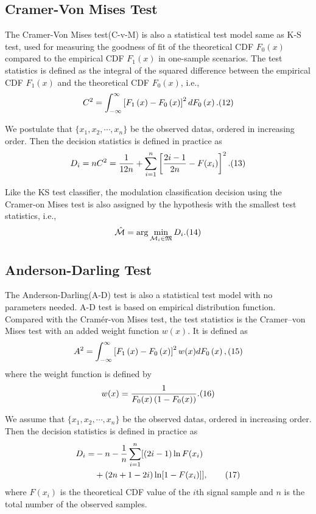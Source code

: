 \documentclass[conference]{IEEEtran}
\begin{document}
\subsection{ Cramer-Von Mises Test}
The Cramer-Von Mises test(C-v-M) is also a statistical test model same as K-S test, used for measuring the goodness of fit of the theoretical CDF $F_{0}\left(x\right)$ compared to the empirical CDF $F_{1}\left(x\right)$ in one-sample scenarios\cite{Cramer}. The test statistics is defined as the integral of the squared difference between the empirical CDF $F_{1}\left(x\right)$ and the theoretical CDF $F_{0}\left(x\right)$, i.e.,
$$C^2=\int_{-\infty}^{\infty}\left[F_{1}\left(x\right)-F_{0}\left(x\right)\right]^{2}dF_{0}\left(x\right).\relax{(12)}$$
\par We postulate that $\{\displaystyle x_{1},x_{2},\cdots ,x_{n}\}$ be the observed datas, ordered in increasing order. Then the decision statistics is defined in practice as
$$D_i=nC^2=\frac{1}{12n}+\sum_{i=1}^{n}\left[\frac{2i-1}{2n}-F(x_{i})\right]^2.\relax{(13)}$$
\par Like the KS test classifier, the modulation classification decision using the Cramer-on Mises test is also assigned by the hypothesis with the smallest test statistics, i.e.,
$$\hat{\mathcal{M}}=\arg\min_{\mathcal{M}_{i}\in \mathfrak{M}}D_{i}.\relax{(14)}$$

\subsection{ Anderson-Darling Test}
The Anderson-Darling(A-D) test is also a statistical test model with no parameters needed\cite{Anderson}. A-D test is based on empirical distribution function. Compared with the Cramér-von Mises test, the test statistics is the Cramer–von Mises test with an added weight function $w(x)$. It is defined as
$$A^2=\int_{-\infty}^{\infty}\left[F_{1}\left(x\right)-F_{0}\left(x\right)\right]^{2}w(x)dF_{0}\left(x\right),\relax{(15)}$$
where the weight function is defined by
$$w(x)=\frac{1}{F_0(x)\left(1-F_0(x)\right)}.\relax{(16)}$$
\par We assume that $\{\displaystyle x_{1},x_{2},\cdots ,x_{n}\}$ be the observed datas, ordered in increasing order. Then the decision statistics is defined in practice as
\begin{align*}
  D_i=&-n-\frac{1}{n}\sum_{i=1}^{n}[(2i-1)\ln{F(x_{i})}\notag\\
      &+(2n+1-2i)\ln[1-F(x_{i})]],\tag{17}
\end{align*}
where $F(x_{i})$ is the theoretical CDF value of the $i$th signal sample and $n$ is the total number of the observed samples.
\end{document}
